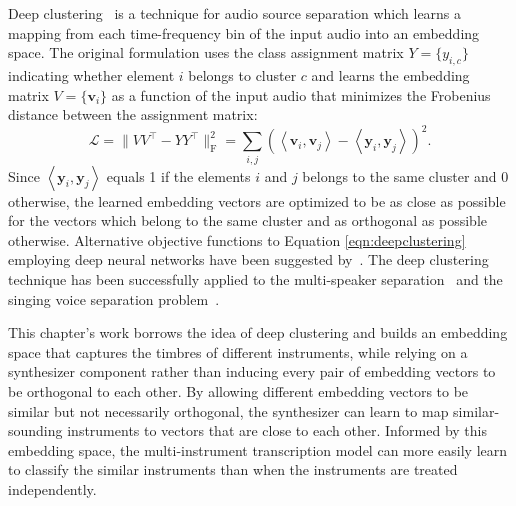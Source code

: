 Deep clustering~\cite{hershey2016deepclustering} is a technique for audio source separation which learns a mapping from each time-frequency bin of the input audio into an embedding space.
The original formulation uses the class assignment matrix $Y = \{ y_{i,c} \}$ indicating whether element $i$ belongs to cluster $c$ and learns the embedding matrix $V = \{ \mathbf{v}_{i} \}$ as a function of the input audio that minimizes the Frobenius distance between the assignment matrix:
\begin{equation}\label{eqn:deepclustering}
\mathcal{L} = \lVert VV^\top - YY^\top \rVert_{\mathrm{F}}^2 = \sum_{i, j} \left ( \left < \mathbf{v}_i, \mathbf{v}_j \right > - \left < \mathbf{y}_i, \mathbf{y}_j \right > \right )^2.
\end{equation}
Since $\left < \mathbf{y}_i, \mathbf{y}_j \right >$ equals 1 if the elements $i$ and $j$ belongs to the same cluster and 0 otherwise, the learned embedding vectors are optimized to be as close as possible for the vectors which belong to the same cluster and as orthogonal as possible otherwise.
Alternative objective functions to Equation \ref{eqn:deepclustering} employing deep neural networks have been suggested by~\cite{wang2018deepclustering}.
The deep clustering technique has been successfully applied to the multi-speaker separation~\cite{isik2016deepclustering} and the singing voice separation problem~\cite{luo2017deepclustering}.

This chapter's work borrows the idea of deep clustering and builds an embedding space that captures the timbres of different instruments, while relying on a synthesizer component rather than inducing every pair of embedding vectors to be orthogonal to each other.
By allowing different embedding vectors to be similar but not necessarily orthogonal, the synthesizer can learn to map similar-sounding instruments to vectors that are close to each other.
Informed by this embedding space, the multi-instrument transcription model can more easily learn to classify the similar instruments than when the instruments are treated independently.



